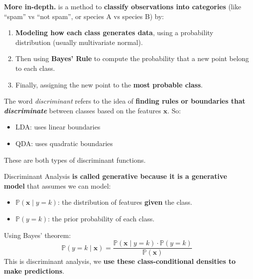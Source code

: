 \highspace
\textcolor{Red2}{ \textbf{More in-depth.}}  is a method to \textbf{classify observations into categories} (like ``spam'' vs ``not spam'', or species A vs species B) by:
\begin{enumerate}
    \item \textbf{Modeling how each class generates data}, using a probability distribution (usually multivariate normal).
    \item Then using \textbf{Bayes' Rule} to compute the probability that a new point belong to each class.
    \item Finally, assigning the new point to the \textbf{most probable class}.
\end{enumerate}
The word \emph{discriminant} refers to the idea of \textbf{finding rules or boundaries that \emph{discriminate}} between classes based on the features $\mathbf{x}$. So:
\begin{itemize}
    \item LDA: uses linear boundaries
    \item QDA: uses quadratic boundaries
\end{itemize}
These are both types of discriminant functions.

\highspace
Discriminant Analysis \textbf{is called generative because it is a generative model} that assumes we can model:
\begin{itemize}
    \item $\mathbb{P}(\mathbf{x} \mid y = k)$: the distribution of features \textbf{given} the class.
    \item $\mathbb{P}(y = k)$: the prior probability of each class.
\end{itemize}
Using Bayes' theorem:
\begin{equation*}
    \mathbb{P}(y = k \mid \mathbf{x}) = \frac{\mathbb{P}(\mathbf{x} \mid y = k) \cdot \mathbb{P}(y = k)}{\mathbb{P}(\mathbf{x})}
\end{equation*}
This is discriminant analysis, we \textbf{use these class-conditional densities to make predictions}.

